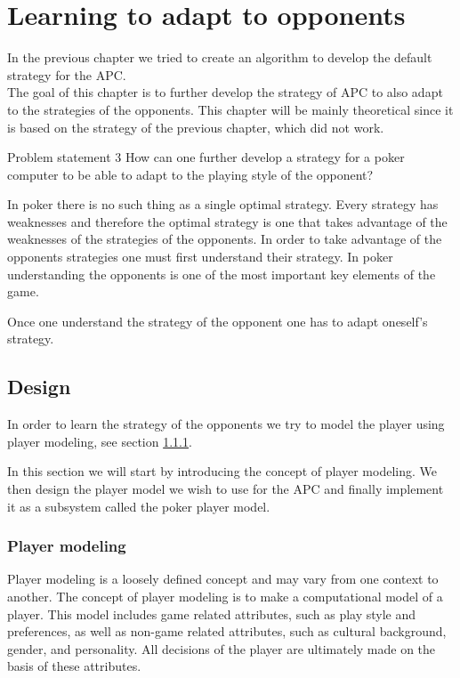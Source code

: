 \section{Learning to adapt to opponents}
\label{sec:part3}

In the previous chapter we tried to create an algorithm to develop the default strategy for the APC. \\

The goal of this chapter is to further develop the strategy of APC to also adapt to the strategies of the opponents. This chapter will be mainly theoretical since it is based on the strategy of the previous chapter, which did not work.

\vspace{4mm}
\begin{statementBox2}{Problem statement 3}
How can one further develop a strategy for a poker computer to be able to adapt to the playing style of the opponent?
\end{statementBox2}
\vspace{4mm} 

In poker there is no such thing as a single optimal strategy. Every strategy has weaknesses and therefore the optimal strategy is one that takes advantage of the weaknesses of the strategies of the opponents. In order to take advantage of the opponents strategies one must first understand their strategy. In poker understanding the opponents is one of the most important key elements of the game. 

Once one understand the strategy of the opponent one has to adapt oneself's strategy.

\subsection{Design}
In order to learn the strategy of the opponents we try to model the player using player modeling, see section \ref{sec:pm}. 

In this section we will start by introducing the concept of player modeling. We then design the player model we wish to use for the APC and finally implement it as a subsystem called the poker player model.


\subsubsection{Player modeling}
\label{sec:pm}
Player modeling is a loosely defined concept and may vary from one context to another. The concept of player modeling is to make a computational model of a player. This model includes game related attributes, such as play style and preferences, as well as non-game related attributes, such as cultural background, gender, and personality. All decisions of the player are ultimately made on the basis of these attributes. 

